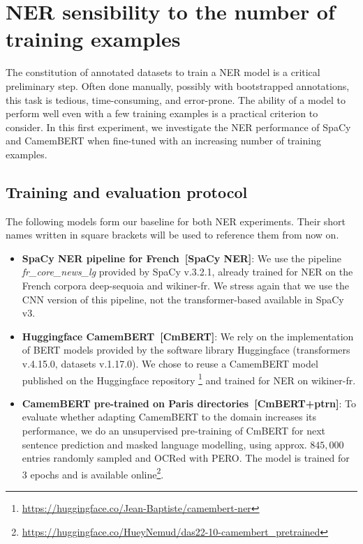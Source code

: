 \section{NER sensibility to the number of training examples}
\label{sec:ner-xp1}
The constitution of annotated datasets to train a NER model is a critical preliminary step.
Often done manually, possibly with bootstrapped annotations, this task is tedious, time-consuming, and error-prone.
The ability of a model to perform well even with a few training examples is a practical criterion to consider.
In this first experiment, we investigate the NER performance of SpaCy and CamemBERT when fine-tuned with an increasing number of training examples.

\subsection{Training and evaluation protocol}
\label{sec:ner-xp1-protocol}
The following models form our baseline for both NER experiments.
Their short names written in square brackets will be used to reference them from now on.
\begin{itemize}
    \item \textbf{SpaCy NER pipeline for French~[SpaCy NER]}: We use the pipeline \textit{fr\_core\_news\_lg} provided by SpaCy v.3.2.1, already trained for NER on the French corpora deep-sequoia and wikiner-fr.
    We stress again that we use the CNN version of this pipeline, not the transformer-based available in SpaCy v3.
    \item \textbf{Huggingface CamemBERT~[CmBERT]}: We rely on the implementation of BERT models provided by the software library Huggingface (transformers v.4.15.0, datasets v.1.17.0).
We chose to reuse a CamemBERT model published on the Huggingface repository \footnote{\url{https://huggingface.co/Jean-Baptiste/camembert-ner}} and trained for NER on wikiner-fr.
\item \textbf{CamemBERT pre-trained on Paris directories~[CmBERT+ptrn]}: 
To evaluate whether adapting CamemBERT to the domain increases its performance, we do an unsupervised pre-training of CmBERT for next sentence prediction and masked language modelling, using approx. $845,000$ entries randomly sampled and OCRed with PERO.
The model is trained for 3 epochs and is available online\footnote{\url{https://huggingface.co/HueyNemud/das22-10-camembert_pretrained}}.
\end{itemize}

